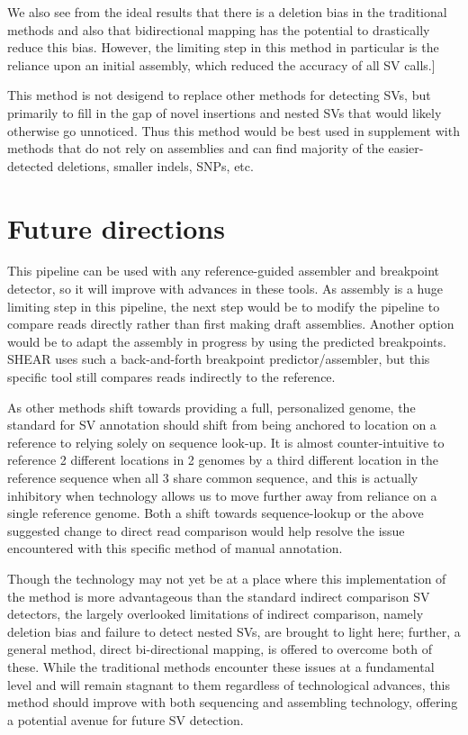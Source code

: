 \documentclass{easychithesis}
\begin{document}
We also see from the ideal results that there is a deletion bias in the traditional methods and also that bidirectional mapping has the potential to drastically reduce this bias. However, the limiting step in this method in particular is the reliance upon an initial assembly, which reduced the accuracy of all SV calls.]

This method is not desigend to replace other methods for detecting SVs, but primarily to fill in the gap of novel insertions and nested SVs that would likely otherwise go unnoticed. Thus this method would be best used in supplement with methods that do not rely on assemblies and can find majority of the easier-detected deletions, smaller indels, SNPs, etc.

\section{Future directions}
This pipeline can be used with any reference-guided assembler and breakpoint detector, so it will improve with advances in these tools. As assembly is a huge limiting step in this pipeline, the next step would be to modify the pipeline to compare reads directly rather than first making draft assemblies. Another option would be to adapt the assembly in progress by using the predicted breakpoints. SHEAR \cite{landman2014shear} uses such a back-and-forth breakpoint predictor/assembler, but this specific tool still compares reads indirectly to the reference.

As other methods shift towards providing a full, personalized genome, the standard for SV annotation should shift from being anchored to location on a reference to relying solely on sequence look-up. It is almost counter-intuitive to reference 2 different locations in 2 genomes by a third different location in the reference sequence when all 3 share common sequence, and this is actually inhibitory when technology allows us to move further away from reliance on a single reference genome. Both a shift towards sequence-lookup or the above suggested change to direct read comparison would help resolve the issue encountered with this specific method of manual annotation.

Though the technology may not yet be at a place where this implementation of the method is more advantageous than the standard indirect comparison SV detectors, the largely overlooked limitations of indirect comparison, namely deletion bias and failure to detect nested SVs, are brought to light here; further, a general method, direct bi-directional mapping, is offered to overcome both of these. While the traditional methods encounter these issues at a fundamental level and will remain stagnant to them regardless of technological advances, this method should improve with both sequencing and assembling technology, offering a potential avenue for future SV detection.
\end{document}
